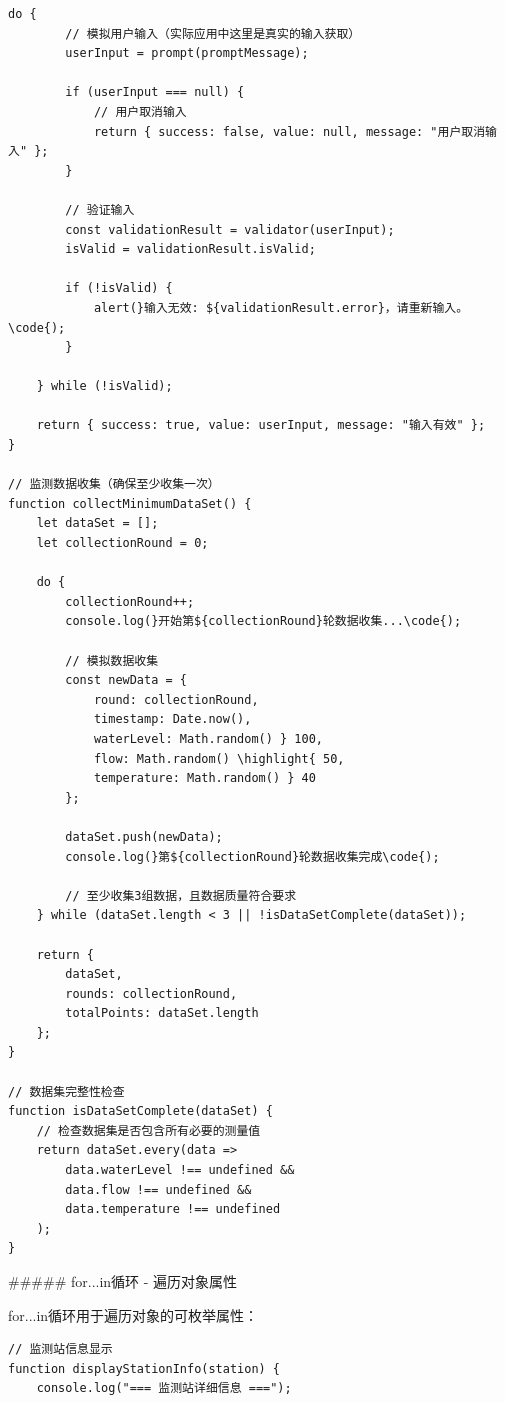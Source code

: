 {\begin{lstlisting}[style=javascript]
    do {
        // 模拟用户输入（实际应用中这里是真实的输入获取）
        userInput = prompt(promptMessage);
        
        if (userInput === null) {
            // 用户取消输入
            return { success: false, value: null, message: "用户取消输入" };
        }
        
        // 验证输入
        const validationResult = validator(userInput);
        isValid = validationResult.isValid;
        
        if (!isValid) {
            alert(}输入无效: ${validationResult.error}，请重新输入。\code{);
        }
        
    } while (!isValid);
    
    return { success: true, value: userInput, message: "输入有效" };
}

// 监测数据收集（确保至少收集一次）
function collectMinimumDataSet() {
    let dataSet = [];
    let collectionRound = 0;
    
    do {
        collectionRound++;
        console.log(}开始第${collectionRound}轮数据收集...\code{);
        
        // 模拟数据收集
        const newData = {
            round: collectionRound,
            timestamp: Date.now(),
            waterLevel: Math.random() } 100,
            flow: Math.random() \highlight{ 50,
            temperature: Math.random() } 40
        };
        
        dataSet.push(newData);
        console.log(}第${collectionRound}轮数据收集完成\code{);
        
        // 至少收集3组数据，且数据质量符合要求
    } while (dataSet.length < 3 || !isDataSetComplete(dataSet));
    
    return {
        dataSet,
        rounds: collectionRound,
        totalPoints: dataSet.length
    };
}

// 数据集完整性检查
function isDataSetComplete(dataSet) {
    // 检查数据集是否包含所有必要的测量值
    return dataSet.every(data => 
        data.waterLevel !== undefined && 
        data.flow !== undefined && 
        data.temperature !== undefined
    );
}
\end{lstlisting}

##### for...in循环 - 遍历对象属性

for...in循环用于遍历对象的可枚举属性：

\begin{lstlisting}[style=javascript]
// 监测站信息显示
function displayStationInfo(station) {
    console.log("=== 监测站详细信息 ===");
    

\end{lstlisting}}

